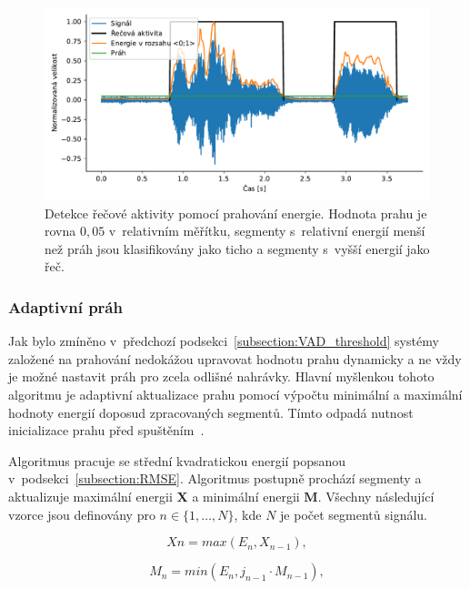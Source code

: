 \begin{figure}[ht]
  \centering
  \includegraphics[width=\linewidth]{obrazky-figures/signal_vad_threshold.pdf}
  \caption{Detekce řečové aktivity pomocí prahování energie. Hodnota prahu je rovna $0,05$ v~relativním měřítku, segmenty s~relativní energií menší než práh jsou klasifikovány jako ticho a segmenty s~vyšší energií jako řeč.}
  \label{fig:VAD_energy_threshold}
\end{figure}

\subsubsection{Adaptivní práh}
\label{subsection:VAD_adaptive_threshold}
Jak bylo zmíněno v~předchozí podsekci~\ref{subsection:VAD_threshold} systémy založené na prahování nedokážou upravovat hodnotu prahu dynamicky a ne vždy je možné nastavit práh pro zcela odlišné nahrávky. Hlavní myšlenkou tohoto algoritmu je adaptivní aktualizace prahu pomocí výpočtu minimální a maximální hodnoty energií doposud zpracovaných segmentů. Tímto odpadá nutnost inicializace prahu před spuštěním~\cite{Simak_adaptive_energy_VAD}.

Algoritmus pracuje se střední kvadratickou energií popsanou v~podsekci~\ref{subsection:RMSE}. Algoritmus postupně prochází segmenty a aktualizuje maximální energii $\mathbf{X}$ a minimální energii $\mathbf{M}$. Všechny následující vzorce jsou definovány pro  $n \in \{1, \dots, N \}$, kde $N$ je počet segmentů signálu.

\begin{equation}
    \label{eqn:E_dynamic_threshold_max}
    X{n} = max(E_{n}, X_{n-1}),
\end{equation}

\begin{equation}
    \label{eqn:E_dynamic_threshold_min}
    M_{n} = min(E_{n}, j_{n-1} \cdot M_{n-1}),
\end{equation}


